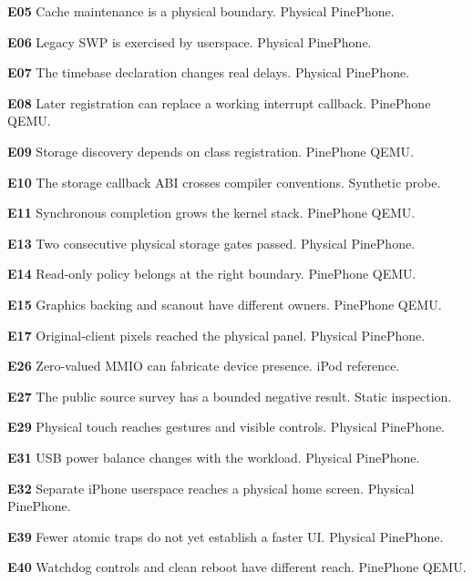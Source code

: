 \documentclass[10pt,letterpaper,twocolumn]{article}
\begin{document}
\noindent\hypertarget{e-E05}{\textbf{E05}} Cache maintenance is a physical boundary. Physical PinePhone.

\noindent\hypertarget{e-E06}{\textbf{E06}} Legacy SWP is exercised by userspace. Physical PinePhone.

\noindent\hypertarget{e-E07}{\textbf{E07}} The timebase declaration changes real delays. Physical PinePhone.

\noindent\hypertarget{e-E08}{\textbf{E08}} Later registration can replace a working interrupt callback. PinePhone QEMU.

\noindent\hypertarget{e-E09}{\textbf{E09}} Storage discovery depends on class registration. PinePhone QEMU.

\noindent\hypertarget{e-E10}{\textbf{E10}} The storage callback ABI crosses compiler conventions. Synthetic probe.

\noindent\hypertarget{e-E11}{\textbf{E11}} Synchronous completion grows the kernel stack. PinePhone QEMU.

\noindent\hypertarget{e-E13}{\textbf{E13}} Two consecutive physical storage gates passed. Physical PinePhone.

\noindent\hypertarget{e-E14}{\textbf{E14}} Read-only policy belongs at the right boundary. PinePhone QEMU.

\noindent\hypertarget{e-E15}{\textbf{E15}} Graphics backing and scanout have different owners. PinePhone QEMU.

\noindent\hypertarget{e-E17}{\textbf{E17}} Original-client pixels reached the physical panel. Physical PinePhone.

\noindent\hypertarget{e-E26}{\textbf{E26}} Zero-valued MMIO can fabricate device presence. iPod reference.

\noindent\hypertarget{e-E27}{\textbf{E27}} The public source survey has a bounded negative result. Static inspection.

\noindent\hypertarget{e-E29}{\textbf{E29}} Physical touch reaches gestures and visible controls. Physical PinePhone.

\noindent\hypertarget{e-E31}{\textbf{E31}} USB power balance changes with the workload. Physical PinePhone.

\noindent\hypertarget{e-E32}{\textbf{E32}} Separate iPhone userspace reaches a physical home screen. Physical PinePhone.

\noindent\hypertarget{e-E39}{\textbf{E39}} Fewer atomic traps do not yet establish a faster UI. Physical PinePhone.

\noindent\hypertarget{e-E40}{\textbf{E40}} Watchdog controls and clean reboot have different reach. PinePhone QEMU.
\end{document}
